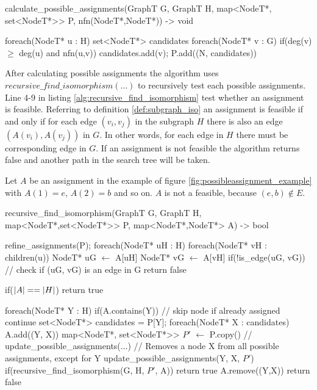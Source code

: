 


\begin{algorithm}[mathescape, caption={Calculate possible assignments}, label={alg:calculate_possible_assignments}]
calculate_possible_assignments(GraphT G, GraphT H, map<NodeT*, set<NodeT*>> P, nfn(NodeT*,NodeT*)) -> void

    foreach(NodeT* u : H)
    	set<NodeT*> candidates
        foreach(NodeT* v : G)        
            if(deg(v) $\geq$ deg(u) and nfn(u,v))
                candidates.add(v);
	    P.add((N, candidates))
\end{algorithm}


After calculating possible assignments the algorithm uses $recursive\_find\_isomorphism(\dots)$ to recursively test each possible assignments. Line 4-9 in listing \ref{alg:recursive_find_isomorphism} test whether an assignment is feasible. Referring to definition \ref{def:subgraph_iso} an assignment is feasible if and only if for each edge $(v_i,v_j)$ in the subgraph $H$ there is also an edge $(A(v_i),A(v_j))$ in $G$. In other words, for each edge in $H$ there must be corresponding edge in $G$. If an assignment is not feasible the algorithm returns false and another path in the search tree will be taken.

Let $A$ be an assignment in the example of figure \ref{fig:possibleassignment_example} with $A(1) = e$, $A(2) = b$ and so on. $A$ is not a feasible, because $(e, b) \notin E$.

\begin{algorithm}[mathescape, caption={Recursive find isomorphism}, label={alg:recursive_find_isomorphism}]
recursive_find_isomorphism(GraphT G, GraphT H, map<NodeT*,set<NodeT*>> P, map<NodeT*,NodeT*> A) -> bool
    
    refine_assignments(P);
    foreach(NodeT* uH : H)
        foreach(NodeT* vH : children(u))
            NodeT* uG $\gets$ A[uH]
            NodeT* vG $\gets$ A[vH]
            if(!is_edge(uG, vG)) // check if (uG, vG) is an edge in G
                return false

    if($\lvert A\rvert == \lvert H\rvert$)
        return true
    
    foreach(NodeT* Y : H)    
        if(A.contains(Y))  // skip node if already assigned
            continue    	
        set<NodeT*> candidates = P[Y];        
        foreach(NodeT* X : candidates)            
            A.add((Y, X))
            map<NodeT*, set<NodeT*>> $P'$ $\gets$ P.copy()
            // update_possible_assignments(...)
            // Removes a node X from all possible assignments, except for Y
            update_possible_assignments(Y, X, $P'$) 
            if(recursive_find_isomorphism(G, H, $P'$, A))
                return true            
            A.remove((Y,X))
    return false
\end{algorithm}


